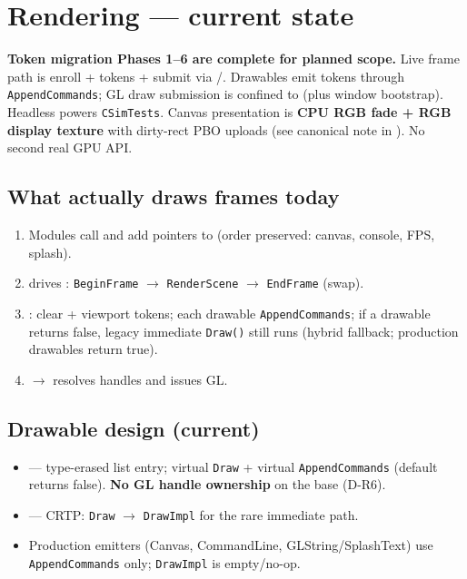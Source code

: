 \section{Rendering --- current state}
\label{sec:rendering-current}

\begin{statusbox}
\textbf{Token migration Phases 1--6 are complete for planned scope.} Live frame
path is enroll + tokens + submit via /.
Drawables emit tokens through \texttt{AppendCommands}; GL draw submission is
confined to  (plus window bootstrap). Headless
 powers \texttt{CSimTests}. Canvas
presentation is \textbf{CPU RGB fade + RGB display texture} with dirty-rect
PBO uploads (see canonical note in ).
No second real GPU API.
\end{statusbox}

\subsection{What actually draws frames today}
\begin{enumerate}
  \item Modules call  and add 
        pointers to  (order preserved: canvas, console, FPS, splash).
  \item {} drives :
        \texttt{BeginFrame} $\rightarrow$ \texttt{RenderScene} $\rightarrow$
        \texttt{EndFrame} (swap).
  \item {}:
        clear + viewport tokens; each drawable \texttt{AppendCommands}; if a
        drawable returns false, legacy immediate \texttt{Draw()} still runs
        (hybrid fallback; production drawables return true).
  \item {} $\rightarrow$
         resolves handles and issues GL.
\end{enumerate}

\subsection{Drawable design (current)}
\begin{itemize}
  \item {} --- type-erased list entry; virtual
        \texttt{Draw} + virtual \texttt{AppendCommands} (default returns false).
        \textbf{No GL handle ownership} on the base (D-R6).
  \item {} --- CRTP: \texttt{Draw} $\rightarrow$
        \texttt{DrawImpl} for the rare immediate path.
  \item Production emitters (Canvas, CommandLine, GLString/SplashText) use
        \texttt{AppendCommands} only; \texttt{DrawImpl} is empty/no-op.
\end{itemize}

